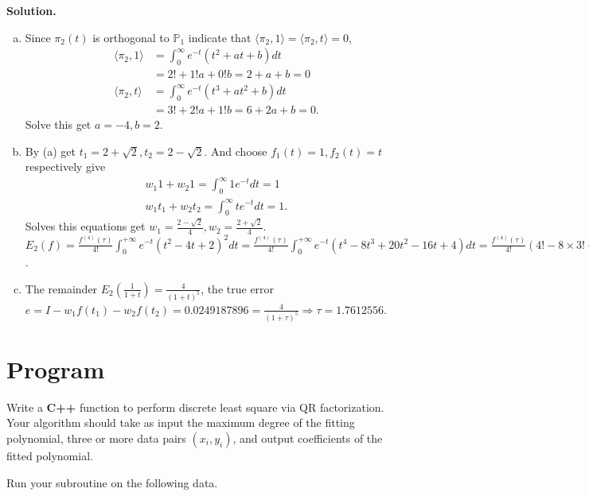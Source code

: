 \documentclass[a4paper]{book}
\newenvironment{solution}%
{\noindent\textbf{Solution.}}%
{\qedhere}
\numberwithin{equation}{chapter}
\theoremstyle{definition}
\begin{document}
\begin{solution}
  \begin{enumerate}[(a)]
  \item Since $\pi_2(t)$ is orthogonal to $\mathbb{P}_1$ indicate that $\langle \pi_2, 1 \rangle = \langle \pi_2,t \rangle = 0$,
    \begin{align*}
      \langle \pi_2,1 \rangle &= \int_0^{\infty} e^{-t}(t^2 + at +b) dt \\
                              & = 2! +  1!a + 0!b = 2 + a + b = 0 \\
      \langle \pi_2,t \rangle &= \int_0^{\infty} e^{-t}(t^3 + at^2 + b)dt \\
      &= 3! + 2!a + 1!b = 6 + 2a + b = 0.
    \end{align*}
    Solve this get $a = -4,b = 2$.

  \item By (a) get $t_1 = 2+ \sqrt{2}, t_2 = 2 - \sqrt{2}$. And choose $f_1(t) = 1,f_2(t) = t$ respectively give
    \begin{align*}
      w_1 1 + w_2 1 = \int_0^{\infty}1 e^{-t}dt = 1 \\
      w_1 t_1 + w_2 t_2 = \int_0^{\infty}t e^{-t}dt = 1.
    \end{align*}
    Solves this equations get $w_1 = \frac{2 - \sqrt{2}}{4},w_2 = \frac{2 + \sqrt{2}}{4}$.
    $E_2(f) = \frac{f^{(4)}(\tau)}{4!} \int_0^{+\infty} e^{-t} (t^2 -4t +2)^2dt = \frac{f^{(4)}(\tau)}{4!} \int_0^{+\infty} e^{-t} (t^4 - 8t^3 + 20t^2 - 16t +4)dt =  \frac{f^{(4)}(\tau)}{4!} (4! - 8 \times 3! + 20 \times 2! - 16 \times 1! + 4 \times 0!) = \frac{f^{(4)}(\tau)}{6}$.

    \item The remainder $E_2(\frac{1}{1 +t}) = \frac{4}{(1 + t)^5}$, the true error $e = I - w_1f(t_1) - w_2f(t_2) = 0.0249187896 = \frac{4}{(1+\tau)^5} \Longrightarrow \tau =1.7612556$. 
  \end{enumerate}
\end{solution}


\section{Program}

Write a \textbf{C++} function to perform discrete least square via QR factorization. Your algorithm should take as input the maximum degree of the fitting polynomial, three or more data pairs $(x_i,y_i)$, and output coefficients of the fitted polynomial.

Run your subroutine on the following data.
\end{document}
